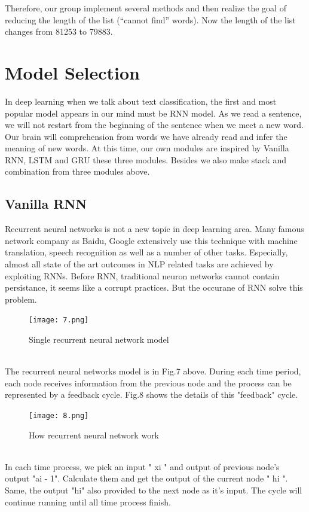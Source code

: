 \documentclass{article}
\begin{document}
\noindent Therefore, our group implement several methods and then realize  the goal of reducing the length of the list (“cannot find” words). Now the length of the list changes from 81253 to 79883.

\section{ Model Selection}
\noindent In deep learning when we talk about text classification,
the first and most popular model appears in our mind must be RNN model. As we read a sentence, we will not restart from the beginning of the sentence when we meet a new word. Our brain will comprehension from words we have already read and infer the meaning of new words. At this time, our own modules are inspired by Vanilla RNN, LSTM and GRU these three modules. Besides we also make stack and combination from three modules above.
\subsection{Vanilla RNN}
\noindent Recurrent neural networks is not a new topic in deep learning area. Many famous network company as Baidu, Google extensively use this technique with machine translation, speech recognition as well as a number of other tasks. Especially, almost all state of the art outcomes in NLP related tasks are achieved by exploiting RNNs. Before RNN, traditional neuron networks cannot contain persistance, it seems like a corrupt practices. But the occurane of RNN solve this problem.
\begin{figure}[h]
	\centering
	\texttt{[image: 7.png]}
	\caption{Single recurrent neural network model}
\end{figure}\\

\noindent The recurrent neural networks model is in Fig.7 above. During each time period, each node receives information from the previous node and the process can be represented by a feedback cycle. Fig.8 shows the details of this "feedback" cycle.
\begin{figure}[h]
	\centering
	\texttt{[image: 8.png]}
	\caption{How recurrent neural network work}
\end{figure}\\

\noindent In each time process, we pick an input " xi " and output of previous node's output "ai - 1". Calculate them and get the output of the current node " hi ". Same, the output "hi" also provided to the next node as it's input. The cycle will continue running until all time process finish.\\
\end{document}
